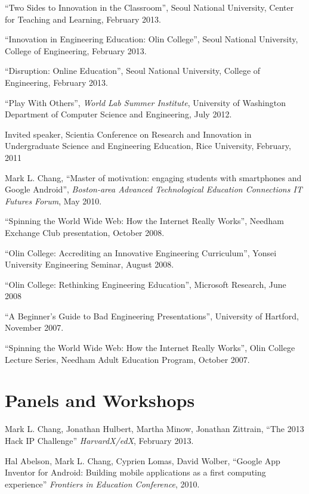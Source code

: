 \documentclass[line]{res}
\begin{document}
\begin{resume}
	``Two Sides to Innovation in the Classroom'', Seoul National University, Center for Teaching and Learning, February 2013.

	``Innovation in Engineering Education: Olin College'', Seoul National University, College of Engineering, February 2013.

	``Disruption: Online Education'', Seoul National University, College of Engineering, February 2013.
	
	``Play With Others'', \textit{World Lab Summer Institute}, University of Washington Department of Computer Science and Engineering, July 2012.

	Invited speaker, Scientia Conference on Research and Innovation in Undergraduate Science and Engineering Education, Rice University, February, 2011
	
	Mark L. Chang, ``Master of motivation: engaging students with smartphones and Google Android'', \textit{Boston-area Advanced Technological Education Connections IT Futures Forum}, May 2010.
	
	``Spinning the World Wide Web: How the Internet Really Works'', Needham Exchange Club presentation, October 2008.
	
	``Olin College: Accrediting an Innovative Engineering Curriculum'', Yonsei University Engineering Seminar, August 2008.
	
	``Olin College: Rethinking Engineering Education'', Microsoft Research, June 2008
	
	``A Beginner's Guide to Bad Engineering Presentations'', University of Hartford, November 2007.
	
	``Spinning the World Wide Web: How the Internet Really Works'', Olin College Lecture Series, Needham Adult Education Program, October 2007.

	\section{\sc Panels and Workshops}
	
	Mark L. Chang, Jonathan Hulbert, Martha Minow, Jonathan Zittrain, ``The 2013 Hack IP Challenge'' \textit{HarvardX/edX}, February 2013.

	Hal Abelson, Mark L. Chang, Cyprien Lomas, David Wolber, ``Google App Inventor for Android: Building mobile applications as a first computing experience'' \textit{Frontiers in Education Conference}, 2010.
	

\end{resume}
\end{document}
